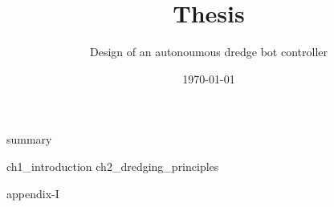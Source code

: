 \documentclass[english, businessunit=mti, status=concept]{IHCreport}
\title{Thesis}
\subtitle{Design of an autonoumous dredge bot controller}
\date{\today}
\begin{document}
%
\begin{front}[]
 {summary}
\end{front}

\begin{main}
 {ch1_introduction}
 {ch2_dredging_principles}
\end{main}

\begin{back}[]
 \printglossaries
 \printbibliography
 \begin{app}
  {appendix-I}
 \end{app}
\end{back}
\end{document}
